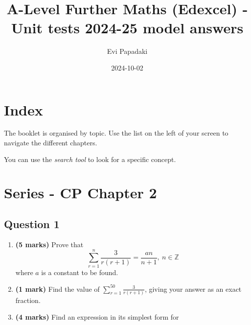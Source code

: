 \documentclass[
  a4paper,
]{report}
\title{A-Level Further Maths (Edexcel) - Unit tests 2024-25 model
answers}
\author{Evi Papadaki}
\date{2024-10-02}
\renewcommand*\contentsname{Table of contents}
\newcommand\contentsname{Table of contents}
\begin{document}
\maketitle

\renewcommand*\contentsname{Table of contents}
{
\hypersetup{linkcolor=}
\setcounter{tocdepth}{2}
\tableofcontents
}


\chapter*{Index}\label{index}


The booklet is organised by topic. Use the list on the left of your
screen to navigate the different chapters.

\begin{tcolorbox}[enhanced jigsaw, leftrule=.75mm, left=2mm, opacitybacktitle=0.6, breakable, bottomtitle=1mm, colframe=quarto-callout-tip-color-frame, opacityback=0, colbacktitle=quarto-callout-tip-color!10!white, toptitle=1mm, arc=.35mm, titlerule=0mm, coltitle=black, rightrule=.15mm, bottomrule=.15mm, toprule=.15mm, title=\textcolor{quarto-callout-tip-color}{\faLightbulb}\hspace{0.5em}{Tip}, colback=white]

You can use the \emph{search tool} to look for a specific concept.

\end{tcolorbox}


\chapter{Series - CP Chapter 2}\label{series---cp-chapter-2}

\section{Question 1}\label{question-1}

\begin{enumerate}
\def\labelenumi{\alph{enumi}.}
\item
  \textbf{(5 marks)} Prove that
  \[\sum_{r = 1}^{n}{\frac{3}{r(r + 1)} = \frac{an}{n + 1},\ n} \in \mathbb{Z}\]
  where \(a\) is a constant to be found.
\item
  \textbf{(1 mark)} Find the value of
  \(\sum_{r = 1}^{50}{\frac{3}{r(r + 1)}}\), giving your answer as an
  exact fraction.
\item
  \textbf{(4 marks)} Find an expression in its simplest form for
\end{enumerate}
\end{document}
